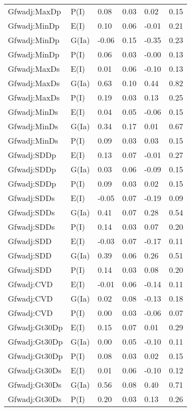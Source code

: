 \begin{center}
\begin{longtable}{|p{1.1in}|p{0.7in}|p{0.7in}|p{0.6in}|p{0.6in}|p{0.6in}|}
  Gfwadj:MaxDp & P(I) & 0.08 & 0.03 & 0.02 & 0.15 \\ 
  Gfwadj:MinDp & E(I) & 0.10 & 0.06 & -0.01 & 0.21 \\ 
  Gfwadj:MinDp & G(Ia) & -0.06 & 0.15 & -0.35 & 0.23 \\ 
  Gfwadj:MinDp & P(I) & 0.06 & 0.03 & -0.00 & 0.13 \\ 
  Gfwadj:MaxDs & E(I) & 0.01 & 0.06 & -0.10 & 0.13 \\ 
  Gfwadj:MaxDs & G(Ia) & 0.63 & 0.10 & 0.44 & 0.82 \\ 
  Gfwadj:MaxDs & P(I) & 0.19 & 0.03 & 0.13 & 0.25 \\ 
  Gfwadj:MinDs & E(I) & 0.04 & 0.05 & -0.06 & 0.15 \\ 
  Gfwadj:MinDs & G(Ia) & 0.34 & 0.17 & 0.01 & 0.67 \\ 
  Gfwadj:MinDs & P(I) & 0.09 & 0.03 & 0.03 & 0.15 \\ 
  Gfwadj:SDDp & E(I) & 0.13 & 0.07 & -0.01 & 0.27 \\ 
  Gfwadj:SDDp & G(Ia) & 0.03 & 0.06 & -0.09 & 0.15 \\ 
  Gfwadj:SDDp & P(I) & 0.09 & 0.03 & 0.02 & 0.15 \\ 
  Gfwadj:SDDs & E(I) & -0.05 & 0.07 & -0.19 & 0.09 \\ 
  Gfwadj:SDDs & G(Ia) & 0.41 & 0.07 & 0.28 & 0.54 \\ 
  Gfwadj:SDDs & P(I) & 0.14 & 0.03 & 0.07 & 0.20 \\ 
  Gfwadj:SDD & E(I) & -0.03 & 0.07 & -0.17 & 0.11 \\ 
  Gfwadj:SDD & G(Ia) & 0.39 & 0.06 & 0.26 & 0.51 \\ 
  Gfwadj:SDD & P(I) & 0.14 & 0.03 & 0.08 & 0.20 \\ 
  Gfwadj:CVD & E(I) & -0.01 & 0.06 & -0.14 & 0.11 \\ 
  Gfwadj:CVD & G(Ia) & 0.02 & 0.08 & -0.13 & 0.18 \\ 
  Gfwadj:CVD & P(I) & 0.00 & 0.03 & -0.06 & 0.07 \\ 
  Gfwadj:Gt30Dp & E(I) & 0.15 & 0.07 & 0.01 & 0.29 \\ 
  Gfwadj:Gt30Dp & G(Ia) & 0.00 & 0.05 & -0.10 & 0.11 \\ 
  Gfwadj:Gt30Dp & P(I) & 0.08 & 0.03 & 0.02 & 0.15 \\ 
  Gfwadj:Gt30Ds & E(I) & 0.01 & 0.06 & -0.10 & 0.12 \\ 
  Gfwadj:Gt30Ds & G(Ia) & 0.56 & 0.08 & 0.40 & 0.71 \\ 
  Gfwadj:Gt30Ds & P(I) & 0.20 & 0.03 & 0.13 & 0.26 \\ 

\end{longtable}
\end{center}
